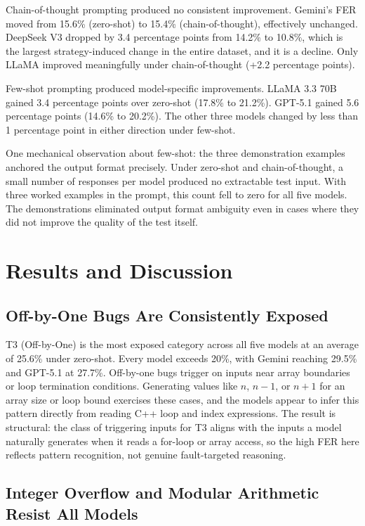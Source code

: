 Chain-of-thought prompting produced no consistent improvement. Gemini's FER moved from 15.6\% (zero-shot) to 15.4\% (chain-of-thought), effectively unchanged. DeepSeek V3 dropped by 3.4 percentage points from 14.2\% to 10.8\%, which is the largest strategy-induced change in the entire dataset, and it is a decline. Only LLaMA improved meaningfully under chain-of-thought (+2.2 percentage points).

Few-shot prompting produced model-specific improvements. LLaMA 3.3 70B gained 3.4 percentage points over zero-shot (17.8\% to 21.2\%). GPT-5.1 gained 5.6 percentage points (14.6\% to 20.2\%). The other three models changed by less than 1 percentage point in either direction under few-shot.

One mechanical observation about few-shot: the three demonstration examples anchored the output format precisely. Under zero-shot and chain-of-thought, a small number of responses per model produced no extractable test input. With three worked examples in the prompt, this count fell to zero for all five models. The demonstrations eliminated output format ambiguity even in cases where they did not improve the quality of the test itself.

\section{Results and Discussion}

\subsection{Off-by-One Bugs Are Consistently Exposed}

T3 (Off-by-One) is the most exposed category across all five models at an average of 25.6\% under zero-shot. Every model exceeds 20\%, with Gemini reaching 29.5\% and GPT-5.1 at 27.7\%. Off-by-one bugs trigger on inputs near array boundaries or loop termination conditions. Generating values like $n$, $n-1$, or $n+1$ for an array size or loop bound exercises these cases, and the models appear to infer this pattern directly from reading C++ loop and index expressions. The result is structural: the class of triggering inputs for T3 aligns with the inputs a model naturally generates when it reads a for-loop or array access, so the high FER here reflects pattern recognition, not genuine fault-targeted reasoning.

\subsection{Integer Overflow and Modular Arithmetic Resist All Models}

